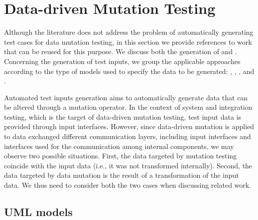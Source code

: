
\section{Data-driven Mutation Testing}
\label{sec:testGenerationData}



Although the literature does not address the problem of automatically generating test cases for data mutation testing, in this section we provide references to work that can be reused for this purpose. 
We discuss both the generation of  and . 
Concerning the generation of test inputs, we group the applicable approaches according to the type of models used to specify the data to be generated: , , , and . 

Automated test inputs generation aims to automatically generate data that can be altered through a mutation operator. 
In the context of system and integration testing, which is the target of data-driven mutation testing, test input data is provided through input interfaces. However, since data-driven mutation is applied to data exchanged different communication layers, including input interfaces and interfaces used for the communication among internal components, we may observe two possible situations. First, the data targeted by mutation testing coincide with the input data (i.e., it was not transformed internally). Second, the data targeted by data mutation is the result of a transformation of the input data. We thus need to consider both the two cases when discussing related work.

\subsection{UML models}




